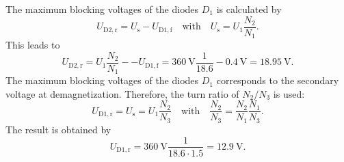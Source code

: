\begin{solutionblock}
    The maximum blocking voltages of the diodes $D_\mathrm{1}$ is calculated by
    \begin{equation}
        U_\mathrm{D2,r}=U_\mathrm{s}-U_\mathrm{D1,f} \quad \text{with} \quad U_\mathrm{s}=U_\mathrm{1}\frac{N_\mathrm{2}}{N_\mathrm{1}}.
    \end{equation}
    This leads to
    \begin{equation}
        U_\mathrm{D2,r}=U_\mathrm{1}\frac{N_\mathrm{2}}{N_\mathrm{1}}--U_\mathrm{D1,f}=
        \SI{360}{\volt}\frac{1}{18.6}-\SI{0.4}{\volt}=\SI{18.95}{\volt}.
    \end{equation}
    The maximum blocking voltages of the diodes $D_\mathrm{1}$ corresponds to the secondary voltage at demagnetization.
    Therefore, the turn ratio of $N_\mathrm{2}/N_\mathrm{3}$ is used:
    \begin{equation}
        U_\mathrm{D1,r}=U_\mathrm{s}=U_\mathrm{1}\frac{N_\mathrm{2}}{N_\mathrm{3}} \quad \text{with} \quad
        \frac{N_\mathrm{2}}{N_\mathrm{3}}=\frac{N_\mathrm{2}}{N_\mathrm{1}}\frac{N_\mathrm{1}}{N_\mathrm{3}}.
    \end{equation}
    The result is obtained by
    \begin{equation}
        U_\mathrm{D1,r}=\SI{360}{\volt}\frac{1}{18.6 \cdot 1.5}=\SI{12.9}{\volt}.
    \end{equation}
\end{solutionblock}

